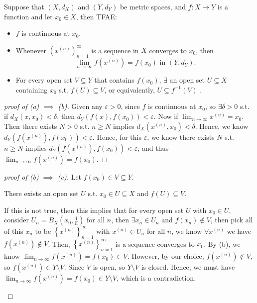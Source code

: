 \begin{theorem} \label{thm: continuous TFAE 1}
    Suppose that \((X, d_X)\) and \((Y, d_Y)\) be metric spaces, and \(f:X \to Y\) is a function and let \(x_0 \in X\), then TFAE: 
    \begin{itemize}
        \item [(a)] \(f\) is continuous at \(x_0\).  
        \item [(b)] Whenever \(\left( x^{(n)} \right)_{n=1}^{\infty}  \) is a sequence in \(X\) converges to \(x_0\), then 
        \[
            \lim_{n \to \infty} f \left( x^{(n)} \right) = f(x_0) \text{ in } \left( Y, d_Y \right).   
        \]
        \item [(c)] For every open set \(V \subseteq Y\) that contains \(f(x_0)\), \(\exists \) an open set \(U \subseteq X\) containing \(x_0\) s.t. \(f(U) \subseteq V\), or equivalently, \(U \subseteq f^{-1}(V)\) .      
    \end{itemize}  
\end{theorem}
\begin{proof}[proof of (a) \(\implies \) (b)]
    Given any \(\varepsilon > 0\), since \(f\) is continuous at \(x_0\), so \(\exists \delta > 0\) s.t. if \(d_X(x, x_0) < \delta \), then \(d_Y (f(x), f(x_0)) < \varepsilon \). Now if \(\lim_{n \to \infty} x^{(n)} = x_0 \). Then there exists \(N > 0\) s.t. \(n \ge N\) implies \(d_X \left( x^{(n)}, x_0 \right) < \delta  \). Hence, we know \(d_Y \left( f \left( x^{(n)}\right),f(x_0)   \right) < \varepsilon \). Hence, for this \(\varepsilon \), we know there exists \(N\) s.t. \(n \ge N\) implies \(d_Y \left( f \left( x^{(n)} \right), f(x_0)  \right) < \varepsilon  \), and thus \(\lim_{n \to \infty} f \left( x^{(n)} \right) = f(x_0)  \).         
\end{proof}
\begin{proof}[proof of (b) \(\implies \) (c)]
    Let \(f(x_0) \in V \subseteq Y\).
    \begin{claim}
        There exists an open set \(U\) s.t. \(x_0 \in U \subseteq X\) and \(f(U) \subseteq V\).   
    \end{claim}
    \begin{explanation}
        If this is not true, then this implies that for every open set \(U\) with \(x_0 \in U\), consider \(U_n = B_X \left( x_0, \frac{1}{n} \right) \) for all \(n\), then \(\exists x_n \in U_n\) and \(f(x_n) \notin V\), then pick all of this \(x_n\) to be \(\left\{ x^{(n)} \right\}_{n=1}^{\infty}  \) with \(x^{(n)} \in U_n\) for all \(n\), we know \(\forall x^{(n)}\) we have \(f \left( x^{(n)} \right) \notin V \).    
        Then, \(\left\{ x^{(n)} \right\}_{n=1}^{\infty}  \) is a sequence converges to \(x_0\). By (b), we know \(\lim_{n \to \infty} f \left( x^{(n)} \right) = f(x_0) \in V  \). However, by our choice, \(f \left( x^{(n)} \right) \notin V \), so \(f \left( x^{(n)} \right) \in Y \setminus V \). Since \(V\) is open, so \(Y\setminus V\) is closed. Hence, we must have \(\lim_{n \to \infty} f \left( x^{(n)} \right) = f(x_0) \in Y \setminus V  \), which is a contradiction. 
    \end{explanation}
\end{proof}
